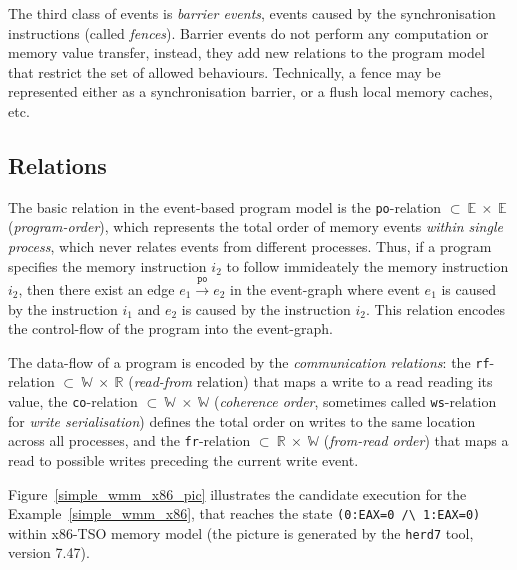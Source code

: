 The third class of events is \textit{barrier events}, events caused by the synchronisation instructions (called \textit{fences}). Barrier events do not perform any computation or memory value transfer, instead, they add new relations to the program model that restrict the set of allowed behaviours. Technically, a fence may be represented either as a synchronisation barrier, or a flush local memory caches, etc.


\subsection{Relations}
\label{ch:wmm:model:relations}

The basic relation in the event-based program model is the \texttt{po}-relation $\subset~\mathbb{E}~\times~\mathbb{E}$ (\textit{program-order}), which represents the total order of memory events \textit{within single process}, which never relates events from different processes. Thus, if a program specifies the memory instruction $i_2$ to follow immideately the memory instruction $i_2$, then there exist an edge $e_1 \xrightarrow{\mathtt{po}} e_2$ in the event-graph where event $e_1$ is caused by the instruction $i_1$ and $e_2$ is caused by the instruction $i_2$. This relation encodes the control-flow of the program into the event-graph.

The data-flow of a program is encoded by the \textit{communication relations}: the \texttt{rf}-relation $\subset~\mathbb{W}~\times~\mathbb{R}$ (\textit{read-from} relation) that maps a write to a read reading its value, the \texttt{co}-relation $\subset~\mathbb{W}~\times~\mathbb{W}$ (\textit{coherence order}, sometimes called \texttt{ws}-relation for \textit{write serialisation}) defines the total order on writes to the same location across all processes, and the \texttt{fr}-relation $\subset~\mathbb{R}~\times~\mathbb{W}$ (\textit{from-read order}) that maps a read to possible writes preceding the current write event.

Figure~\ref{simple_wmm_x86_pic} illustrates the candidate execution for the Example~\ref{simple_wmm_x86}, that reaches the state \texttt{(0:EAX=0~/\textbackslash~1:EAX=0)} within x86-TSO memory model (the picture is generated by the \texttt{herd7} tool, version 7.47). 

